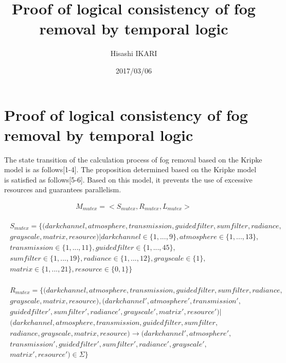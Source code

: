 \documentclass{jsarticle}
\title{Proof of logical consistency of fog removal by temporal logic}
\author{Hisashi IKARI}
\date{2017/03/06}
\begin{document}
\part{Proof of logical consistency of fog removal by temporal logic}
\label{Proof of logical consistency of fog removal by temporal logic}

The state transition of the calculation process of fog removal based on the Kripke model is as follows[1-4].
The proposition determined based on the Kripke model is satisfied as follows[5-6]. Based on this model, it prevents the use of excessive resources and guarantees parallelism.


\begin{equation}
\begin{split}
M_{mutex}=<S_{mutex}, R_{mutex}, L_{mutex}>
\end{split}
\end{equation}

\begin{equation}
\begin{split}
\begin{gathered}
S_{mutex}=\bigl\{(darkchannel, atmosphere, transmission, guidedfilter,sumfilter,radiance, \\
grayscale, matrix, resource) | darkchannel \in \bigl\{1,...,9\bigr\}, atmosphere \in \bigl\{1,...,13\bigr\}, \\
transmission \in \bigl\{1,...,11\bigr\},guidedfilter \in \bigl\{1,...,45\bigr\}, \\
sumfilter \in \bigl\{1,...,19\bigr\}, radiance \in \bigl\{1,...,12\bigr\}, grayscale \in \bigl\{1\bigr\}, \\
matrix \in \bigl\{1,...,21\bigr\}, resource  \in \bigl\{0, 1\bigr\}\bigr\}
\end{gathered}
\end{split}
\end{equation}

\begin{equation}
\begin{split}
\begin{gathered}
R_{mutex}=\bigl\{(darkchannel, atmosphere, transmission, guidedfilter, sumfilter, radiance, \\
grayscale, matrix, resource), (darkchannel', atmosphere', transmission', \\
guidedfilter',sumfilter', radiance', grayscale', matrix', resource') | \\
(darkchannel, atmosphere, transmission, guidedfilter, sumfilter, \\
radiance, grayscale, matrix, resource) \rightarrow (darkchannel', atmosphere', \\
transmission', guidedfilter', sumfilter', radiance', grayscale', \\
matrix', resource') \in \Sigma \bigr\}
\end{gathered}
\end{split}
\end{equation}
\end{document}
